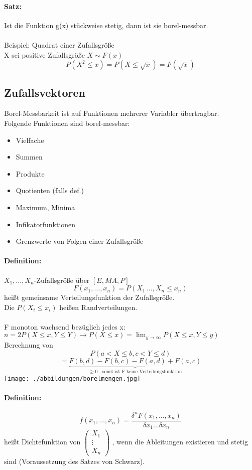 \documentclass[a4paper,12pt]{scrartcl}
\begin{document}
 \paragraph{Satz:} Ist die Funktion g(x) stückweise stetig, dann ist sie borel-messbar.\\
 \\
 Beispiel: Quadrat einer Zufallsgröße\\
 X sei positive Zufallsgröße $X\sim F(x)$
 $$P(X^2\leq x) = P(X\leq \sqrt{x}) = F(\sqrt{x}) $$
 
 \subsection{Zufallsvektoren}
 Borel-Messbarkeit ist auf Funktionen mehrerer Variabler übertragbar.\\
 Folgende Funktionen sind borel-messbar:
 \begin{itemize}
  \item Vielfache
  \item Summen
  \item Produkte
  \item Quotienten (falls def.)
  \item Maximum, Minima
  \item Infikatorfunktionen
  \item Grenzwerte von Folgen einer Zufallsgröße
 \end{itemize}

 \paragraph{Definition:} $X_1,\dots,X_n$-Zufallsgröße über $[E,MA,P]$
 $$F(x_1,\dots,x_n) = P(X_1\,\dots,X_n\leq x_n)$$
 heißt gemeinsame Verteilungsfunktion der Zufallsgröße.\\
 Die $P(X_i\leq x_i)$ heißen Randverteilungen.\\
 \\
 F monoton wachsend bezüglich jedes x:\\
 $n=2$\quad\quad$P(X\leq x, Y\leq Y) \rightarrow P(X\leq x) = \lim_{y\rightarrow\infty}P(X\leq x, Y\leq y)$\\
 
 Berechnung von 
 $$P(a<X\leq b, c<Y\leq d)$$
 $$=\underbrace{F(b,d)-F(b,c)-F(a,d)+F(a,c)}_{\geq 0\text{ , sonst ist F keine Verteilungsfunktion}}$$
 \texttt{[image: ./abbildungen/borelmengen.jpg]}\\
 
 \paragraph{Definition:}
 $$f(x_1,\dots,x_n) = \frac{\delta^nF(x_1,\dots,x_n)}{\delta x_1 \dots \delta x_n}$$
 heißt Dichtefunktion von $\begin{pmatrix}  X_1 \\  \vdots \\  X_n \end{pmatrix}$ , wenn die Ableitungen existieren und stetig sind (Voraussetzung des Satzes von Schwarz).\\
 \\
\end{document}
